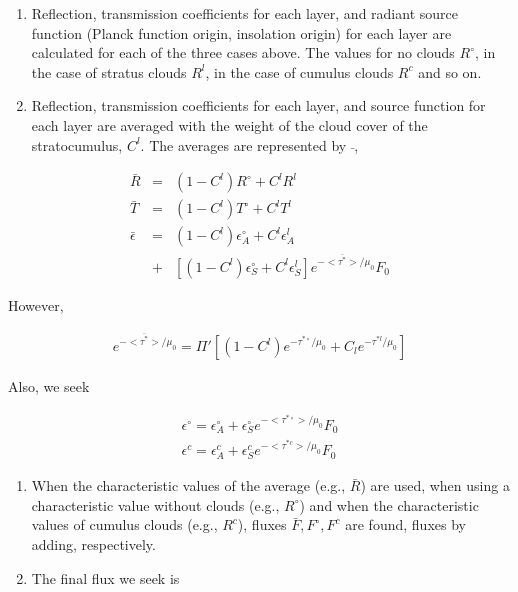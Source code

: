 \begin{enumerate}
\def\labelenumi{\arabic{enumi}.}
\setcounter{enumi}{1}
\item
  Reflection, transmission coefficients for each layer, and radiant
  source function (Planck function origin, insolation origin) for each layer are
  calculated for each of the three cases above. The values for no clouds
  \(R^\circ\), in the case of stratus clouds \(R^l\), in the case of
  cumulus clouds \(R^c\) and so on.
\item
  Reflection, transmission coefficients for each layer, and source
  function for each layer are averaged with the weight of the cloud cover of the
  stratocumulus, \(C^l\). The averages are represented by \(\bar{}\),
\end{enumerate}

      \begin{eqnarray}
        \bar{R} & = & ( 1 - C^l ) R^\circ + C^l R^l \\
        \bar{T} & = & ( 1 - C^l ) T^\circ + C^l T^l \\
        \bar{\epsilon} & = & 
            ( 1 - C^l ) \epsilon_A^\circ + C^l \epsilon_A^l \\        
          & + & 
            \left[ ( 1 - C^l ) \epsilon_S^\circ + C^l \epsilon_S^l \right] 
            e^{-\overline{<\tau^*>}/\mu_0} F_0 
      \end{eqnarray}

However,

\begin{eqnarray}
        e^{-\overline{<\tau^*>}/\mu_0} 
        = \Pi' \left[ ( 1 - C^l ) e^{-\tau^{*\circ}/\mu_0} 
                       + C_l e^{-\tau^{*l}/\mu_0} \right]
\end{eqnarray}

Also, we seek

\begin{eqnarray}
        \epsilon^\circ  =  \epsilon_A^\circ +
                             \epsilon_S^\circ 
                              e^{-<\tau^{*\circ}>/\mu_0} F_0 \\
        \epsilon^c      =  \epsilon_A^c +
                             \epsilon_S^c 
                              e^{-<\tau^{*c}>/\mu_0} F_0        
\end{eqnarray}

\begin{enumerate}
\def\labelenumi{\arabic{enumi}.}
\setcounter{enumi}{3}
\item
  When the characteristic values of the average (e.g., \(\bar{R}\)) are
  used, when using a characteristic value without clouds (e.g.,
  \(R^\circ\)) and when the characteristic values of cumulus clouds (e.g.,
  \(R^c\)),  fluxes $\bar{F}, F^\circ, F^c$ are found, fluxes by adding, respectively.
\item
  The final flux we seek is
\end{enumerate}

